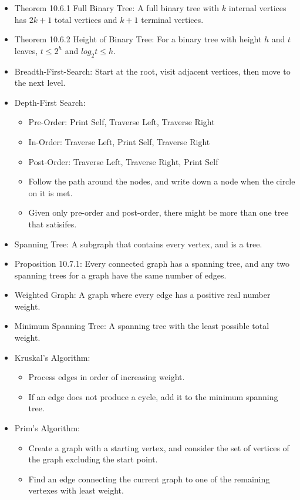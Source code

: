 \documentclass[10pt, portrait]{article}
\begin{document}
\begin{multicols*}{2}
\begin{itemize}
    \item Theorem 10.6.1 Full Binary Tree: A full binary tree with $k$ internal vertices has $2k+1$ total vertices and $k+1$ terminal vertices.
    \item Theorem 10.6.2 Height of Binary Tree: For a binary tree with height $h$ and $t$ leaves, $t \leq 2^h$ and $log_2t\leq h$.
    \item Breadth-First-Search: Start at the root, visit adjacent vertices, then move to the next level.
    \item Depth-First Search:
    \begin{itemize}
        \item Pre-Order: Print Self, Traverse Left, Traverse Right
        \item In-Order: Traverse Left, Print Self, Traverse Right
        \item Post-Order: Traverse Left, Traverse Right, Print Self
        \item Follow the path around the nodes, and write down a node when the circle on it is met.
        \item Given only pre-order and post-order, there might be more than one tree that satisifes.
    \end{itemize}
    \item Spanning Tree: A subgraph that contains every vertex, and is a tree.
    \item Proposition 10.7.1: Every connected graph has a spanning tree, and any two spanning trees for a graph have the same number of edges.
    \item Weighted Graph: A graph where every edge has a positive real number weight.
    \item Minimum Spanning Tree: A spanning tree with the least possible total weight.
    \item Kruskal's Algorithm:
    \begin{itemize}
        \item Process edges in order of increasing weight.
        \item If an edge does not produce a cycle, add it to the minimum spanning tree.
    \end{itemize}
    \item Prim's Algorithm:
    \begin{itemize}
        \item Create a graph with a starting vertex, and consider the set of vertices of the graph excluding the start point.
        \item Find an edge connecting the current graph to one of the remaining vertexes with least weight.

\end{itemize}
\end{itemize}
\end{multicols*}
\end{document}
